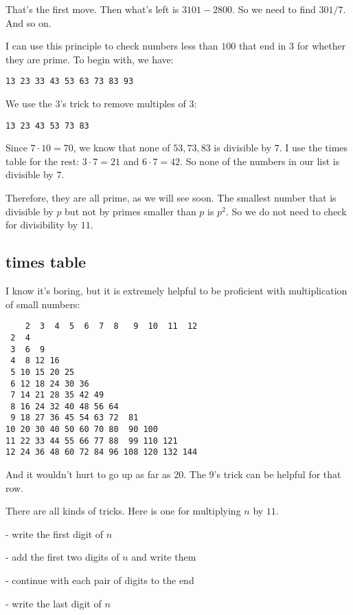 \documentclass[11pt, oneside]{article}
\begin{document}
That's the first move.  Then what's left is $3101 - 2800$.  So we need to find $301/7$.  And so on.

I can use this principle to check numbers less than $100$ that end in $3$ for whether they are prime.  To begin with, we have:

\begin{verbatim}
13 23 33 43 53 63 73 83 93
\end{verbatim}

We use the $3$'s trick to remove multiples of $3$:

\begin{verbatim}
13 23 43 53 73 83
\end{verbatim}

Since $7 \cdot 10 = 70$, we know that none of $53, 73, 83$ is divisible by $7$.  I use the times table for the rest:  $3 \cdot 7 = 21$ and $6 \cdot 7 = 42$.  So none of the numbers in our list is divisible by $7$. 

Therefore, they are all prime, as we will see soon.  The smallest number that is divisible by $p$ but not by primes smaller than $p$ is $p^2$.  So we do not need to check for divisibility by $11$.

\subsection*{times table}

I know it's boring, but it is extremely helpful to be proficient with multiplication of small numbers:

\begin{verbatim}
    2  3  4  5  6  7  8   9  10  11  12
 2  4
 3  6  9
 4  8 12 16
 5 10 15 20 25
 6 12 18 24 30 36
 7 14 21 28 35 42 49
 8 16 24 32 40 48 56 64
 9 18 27 36 45 54 63 72  81
10 20 30 40 50 60 70 80  90 100
11 22 33 44 55 66 77 88  99 110 121
12 24 36 48 60 72 84 96 108 120 132 144
\end{verbatim}

And it wouldn't hurt to go up as far as $20$.  The $9$'s trick can be helpful for that row.

There are all kinds of tricks.  Here is one for multiplying $n$ by $11$.  

- write the first digit of $n$

- add the first two digits of $n$ and write them

- continue with each pair of digits to the end

- write the last digit of $n$
\end{document}
